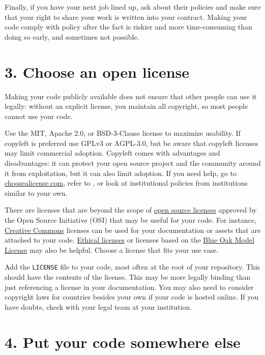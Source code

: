 \documentclass[10pt,letterpaper]{article}
\begin{document}
Finally,
if you have your next job lined up,
ask about their policies
and make sure that your right to share your work is written into your contract.
Making your code comply with policy after the fact is riskier and more time-consuming than doing so early,
and sometimes not possible.

\section*{3. Choose an open license}

Making your code publicly available does not ensure that other people can use it legally:
without an explicit license,
you maintain all copyright,
so most people cannot use your code.

Use the MIT, Apache 2.0, or BSD-3-Clause license to maximize usability.
If copyleft is preferred use GPLv3 or AGPL-3.0,
but be aware that copyleft licenses may limit commercial adoption.
Copyleft comes with advantages and disadvantages:
it can protect your open source project and the community around it from exploitation,
but it can also limit adoption.
If you need help,
go to \href{http://choosealicense.com}{choosealicense.com},
refer to \cite{Furtonato2021},
or look at institutional policies from institutions similar to your own.

There are licenses that are beyond the scope of
\href{https://opensource.org/licenses}{open source licenses}
approved by the Open Source Initiative (OSI)
that may be useful for your code.
For instance,
\href{https://creativecommons.org/}{Creative Commons} licenses can be used for your documentation
or assets that are attached to your code.
\href{https://ethicalsource.dev/}{Ethical licenses}
or licenses based on the \href{https://blueoakcouncil.org/license/1.0.0}{Blue Oak Model License} may also be helpful.
Choose a license that fits your use case.

Add the \texttt{LICENSE} file to your code,
most often at the root of your repository.
This should have the contents of the license.
This may be more legally binding than just referencing a license in your documentation.
You may also need to consider copyright laws for countries besides your own if your code is hosted online.
If you have doubts,
check with your legal team at your institution.

\section*{4. Put your code somewhere else}
\end{document}
